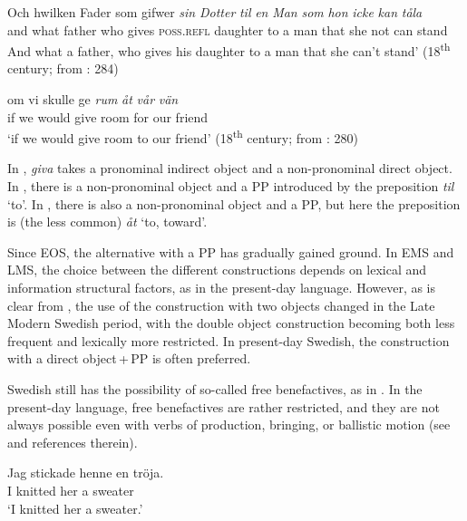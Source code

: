\documentclass[output=paper]{langscibook}
\begin{document}
\ex\label{ex:intro:22b}
\gll  Och hwilken Fader som gifwer \textit{sin} \textit{Dotter} \textit{til} \textit{en} \textit{Man} \textit{som} \textit{hon} \textit{icke} \textit{kan} \textit{tåla}\\
      and   what    father   who gives     \textsc{poss.refl}  daughter     to   a   man that she   not   can  stand\\
\glt  And what a father, who gives his daughter to a man that she can’t stand’ (18\textsuperscript{th} century; from \citealt{Valdeson2016}: 284)


\ex \label{ex:intro:22c}
\gll  om   vi     skulle   ge \textit{rum} \textit{åt} \textit{vår} \textit{vän}\\
      if     we   would   give   room for   our   friend\\
    \glt `if we would give room to our friend’ (18\textsuperscript{th} century; from \citealt{Valdeson2016}: 280)
\z
\z

In , \textit{giva} takes a pronominal indirect object and a non-pronominal direct object. In , there is a non-pronominal object and a PP introduced by the preposition \textit{til} ‘to’. In , there is also a non-pronominal object and a PP, but here the preposition is (the less common) \textit{åt} ‘to, toward’.



Since EOS, the alternative with a PP has gradually gained ground. In EMS and LMS, the choice between the different constructions depends on lexical and information structural factors, as in the present-day language. However, as is clear from , the use of the construction with two objects changed in the Late Modern Swedish period, with the double object construction becoming both less frequent and lexically more restricted. In present-day Swedish, the construction with a direct object\,+\,PP is often preferred. 



Swedish still has the possibility of so-called free benefactives, as in . In the present-day language, free benefactives are rather restricted, and they are not always possible even with verbs of production, bringing, or ballistic motion (see \citealt{Lundquist2014Double} and references therein).


\ea\label{ex:intro:23}
\gll  Jag   stickade  henne   en   tröja. \\
I         knitted   her     a     sweater\\
\glt ‘I knitted her a sweater.’
\z
\end{document}
